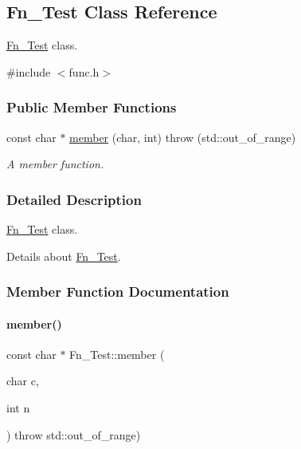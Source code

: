 \hypertarget{class_fn___test}{}\subsection{Fn\+\_\+\+Test Class Reference}
\label{class_fn___test}


\hyperlink{class_fn___test}{Fn\+\_\+\+Test} class.  




{\ttfamily \#include $<$func.\+h$>$}

\subsubsection*{Public Member Functions}
\begin{DoxyCompactItemize}
\item 
const char $\ast$ \hyperlink{class_fn___test_a823b5c9726bb8f6ece50e57ac8e3092c}{member} (char, int)  throw (std\+::out\+\_\+of\+\_\+range)
\begin{DoxyCompactList}\small\item\em A member function. \end{DoxyCompactList}\end{DoxyCompactItemize}


\subsubsection{Detailed Description}
\hyperlink{class_fn___test}{Fn\+\_\+\+Test} class. 

Details about \hyperlink{class_fn___test}{Fn\+\_\+\+Test}. 

\subsubsection{Member Function Documentation}
\mbox{\label{class_fn___test_a823b5c9726bb8f6ece50e57ac8e3092c}} 
\paragraph{\texorpdfstring{member()}{member()}}
{\footnotesize\ttfamily const char $\ast$ Fn\+\_\+\+Test\+::member (\begin{DoxyParamCaption}\item[{char}]{c,  }\item[{int}]{n }\end{DoxyParamCaption}) throw  std\+::out\+\_\+of\+\_\+range) }



